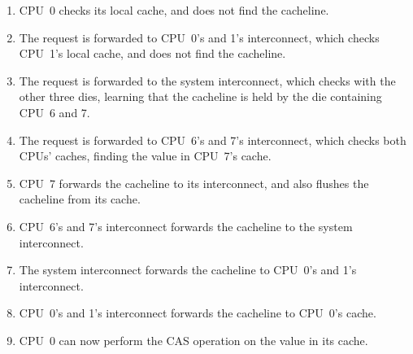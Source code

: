 \begin{enumerate}
\item	CPU~0 checks its local cache, and does not find the cacheline.
\item	The request is forwarded to CPU~0's and 1's interconnect,
	which checks CPU~1's local cache, and does not find the cacheline.
\item	The request is forwarded to the system interconnect, which
	checks with the other three dies, learning that the cacheline
	is held by the die containing CPU~6 and 7.
\item	The request is forwarded to CPU~6's and 7's interconnect, which
	checks both CPUs' caches, finding the value in CPU~7's cache.
\item	CPU~7 forwards the cacheline to its interconnect, and also
	flushes the cacheline from its cache.
\item	CPU~6's and 7's interconnect forwards the cacheline to the
	system interconnect.
\item	The system interconnect forwards the cacheline to CPU~0's and 1's
	interconnect.
\item	CPU~0's and 1's interconnect forwards the cacheline to CPU~0's
	cache.
\item	CPU~0 can now perform the CAS operation on the value in its cache.
\fi
\end{enumerate}

